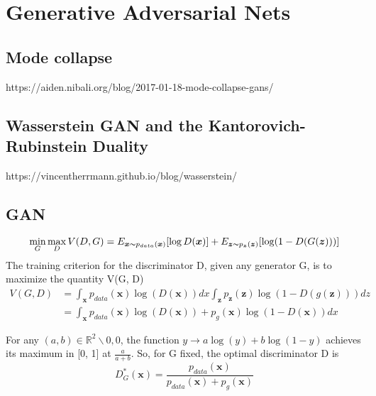 \chapter{Generative Adversarial Nets}

\section{Mode collapse}
https://aiden.nibali.org/blog/2017-01-18-mode-collapse-gans/

\section{Wasserstein GAN and the Kantorovich-Rubinstein Duality}
https://vincentherrmann.github.io/blog/wasserstein/

\section{GAN}
\begin{equation}
    \min_G \max_D V(D, G) = E_{\boldsymbol{x} \thicksim p_{data}(\boldsymbol{x})}[\log D(\boldsymbol{x})] + E_{\boldsymbol{z} \thicksim p_{\boldsymbol{z}}(\boldsymbol{z})}[\log (1 - D(G(\boldsymbol{z})))]
\end{equation}
The training criterion for the discriminator D, given any generator G, is to maximize the
quantity V(G, D)
\begin{equation}
    \begin{split}
        V(G, D) &= \int_{\boldsymbol{x}} p_{data}(\boldsymbol{x}) \log (D(\boldsymbol{x})) dx \int_{\boldsymbol{z}} p_{\boldsymbol{z}}(\boldsymbol{z}) \log(1 - D(g(\boldsymbol{z})))dz \\
        &= \int_{\boldsymbol{x}} p_{data}(\boldsymbol{x}) \log(D(\boldsymbol{x})) + p_g(\boldsymbol{x}) \log (1 - D(\boldsymbol{x})) dx
    \end{split}
\end{equation}

For any $(a, b) \in \mathbb{R}^2 \backslash {0, 0}$, the function $ y \to a\log(y) + b\log(1 - y)$
achieves its maximum in [0, 1] at $\frac{a}{a + b}$.
So, for G fixed, the optimal discriminator D is
\begin{equation}
    D_{G}^{*}(\boldsymbol{x}) = \frac{p_{data}(\boldsymbol{x})}{p_{data}(\boldsymbol{x}) + p_g(\boldsymbol{x})}
\end{equation}

